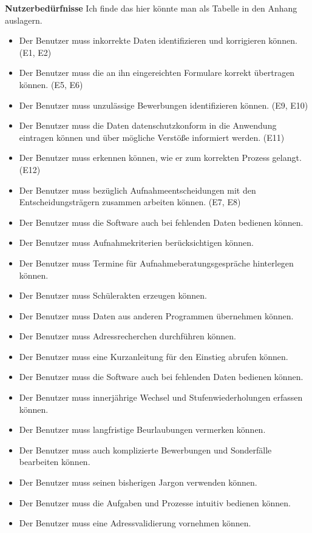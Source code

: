 \textbf{Nutzerbedürfnisse}
Ich finde das hier könnte man als Tabelle in den Anhang auslagern.
\begin{itemize}
     \item Der Benutzer muss inkorrekte Daten identifizieren und korrigieren können. (E1, E2)
     \item Der Benutzer muss die an ihn eingereichten Formulare korrekt übertragen können. (E5, E6)
     \item Der Benutzer muss unzulässige Bewerbungen identifizieren können. (E9, E10)
     \item Der Benutzer muss die Daten datenschutzkonform in die Anwendung eintragen können und über mögliche Verstöße informiert werden. (E11)
     \item Der Benutzer muss erkennen können, wie er zum korrekten Prozess gelangt. (E12)
     \item Der Benutzer muss bezüglich Aufnahmeentscheidungen mit den Entscheidungsträgern zusammen arbeiten können. (E7, E8)
     \item Der Benutzer muss die Software auch bei fehlenden Daten bedienen können. 
     \item Der Benutzer muss Aufnahmekriterien berücksichtigen können.
     \item Der Benutzer muss Termine für Aufnahmeberatungsgespräche hinterlegen können.
     \item Der Benutzer muss Schülerakten erzeugen können.
     \item Der Benutzer muss Daten aus anderen Programmen übernehmen können.
     \item Der Benutzer muss Adressrecherchen durchführen können.
     \item Der Benutzer muss eine Kurzanleitung für den Einstieg abrufen können.
     \item Der Benutzer muss die Software auch bei fehlenden Daten bedienen können.
     \item Der Benutzer muss innerjährige Wechsel und Stufenwiederholungen erfassen können.
     \item Der Benutzer muss langfristige Beurlaubungen vermerken können.
     \item Der Benutzer muss auch komplizierte Bewerbungen und Sonderfälle bearbeiten können.
     \item Der Benutzer muss seinen bisherigen Jargon verwenden können.
     \item Der Benutzer muss die Aufgaben und Prozesse intuitiv bedienen können.
     \item Der Benutzer muss eine Adressvalidierung vornehmen können.

\end{itemize}
